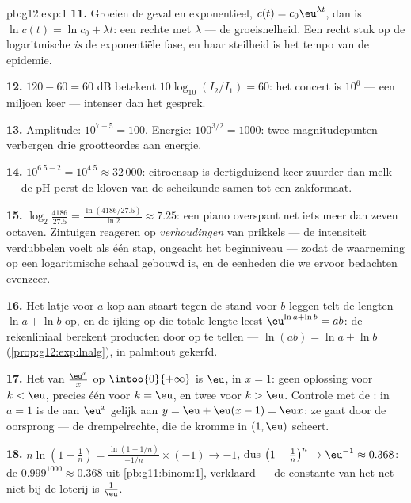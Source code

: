 \begin{solution}{pb:g12:exp:1}
\textbf{11.} Groeien de gevallen exponentieel, $c(t) = c_0 \eu^{\lambda t}$,
dan is $\ln c(t) = \ln c_0 + \lambda t$: een rechte met
 $\lambda$ --- de groeisnelheid. Een recht stuk op de
logaritmische  \emph{is} de exponentiële fase, en haar steilheid is
het tempo van de epidemie.

\textbf{12.} $120 - 60 = 60$ dB betekent $10\log_{10}(I_2/I_1) = 60$: het
concert is $10^6$ --- een miljoen keer --- intenser dan het gesprek.

\textbf{13.} Amplitude: $10^{7-5} = 100$. Energie: $100^{3/2} = 1000$: twee
magnitudepunten verbergen drie grootteordes aan energie.

\textbf{14.} $10^{6.5 - 2} = 10^{4.5} \approx 32\,000$: citroensap is
dertigduizend keer zuurder dan melk --- de pH perst de kloven van de
scheikunde samen tot een zakformaat.

\textbf{15.} $\log_2\!\frac{4186}{27.5} = \frac{\ln(4186/27.5)}{\ln 2}
\approx 7.25$: een piano overspant net iets meer dan zeven octaven. Zintuigen
reageren op \emph{verhoudingen} van prikkels --- de intensiteit verdubbelen
voelt als één stap, ongeacht het beginniveau --- zodat de waarneming op een
logaritmische schaal gebouwd is, en de eenheden die we ervoor bedachten
evenzeer.

\textbf{16.} Het latje voor $a$ kop aan staart tegen de stand voor $b$
leggen telt de lengten $\ln a + \ln b$ op, en de ijking op die totale lengte
leest $\eu^{\ln a + \ln b} = ab$: de rekenliniaal berekent producten door
 op te tellen --- $\ln(ab) = \ln a + \ln b$
(\cref{prop:g12:exp:lnalg}), in palmhout gekerfd.

\textbf{17.} Het  van $\frac{\eu^x}{x}$ op $\intoo{0}{+\infty}$ is
$\eu$, in $x = 1$: geen oplossing voor $k < \eu$, precies één voor $k = \eu$,
en twee voor $k > \eu$. Controle met de : in $a = 1$ is de 
aan $\eu^x$ gelijk aan $y = \eu + \eu(x - 1) = \eu x$: ze gaat door de
oorsprong --- de drempelrechte, die de kromme in $(1, \eu)$ scheert.

\textbf{18.} $n \ln\!\left(1 - \frac1n\right) = \frac{\ln(1 - 1/n)}{-1/n}
\times (-1) \to -1$, dus $\left(1 - \frac1n\right)^n \to \eu^{-1} \approx
0.368$: de $0.999^{1000} \approx 0.368$ uit \cref{pb:g11:binom:1},
verklaard --- de constante van het net-niet bij de loterij is $\frac1\eu$.


\end{solution}
